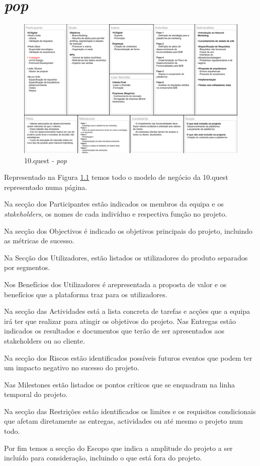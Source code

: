 \chapter{\textit{\gls{pop}}}
\label{a:bvm}

\begin{figure}[ht!]
	\begin{center}
		\includegraphics[width=1\textwidth]{img/bmc}
		\caption{10.quest - \textit{\gls{pop}}}
		\label{10q-bmc}
	\end{center}
\end{figure}

Representado na Figura \ref{10q-bmc} temos todo o modelo de negócio da 10.quest representado numa página.

Na secção dos Participantes estão indicados os membros da equipa e os \textit{stakeholders}, os nomes de cada indivíduo e respectiva função no projeto. 
 
Na secção dos Objectivos é indicado os objetivos principais do projeto, incluindo as métricas de sucesso. 
 
Na Secção dos Utilizadores, estão listados os utilizadores do produto separados por segmentos. 
 
Nos Benefícios dos Utilizadores é arepresentada a proposta de valor e os benefícios que a plataforma traz para os utilizadores. 
 
Na secção das Actividades está a lista concreta de tarefas e acções que a equipa irá ter que realizar para atingir os objetivos do projeto. Nas Entregas estão indicados os resultados e documentos que terão de ser apresentados aos stakeholders ou ao cliente. 
 
Na secção dos Riscos estão identificados possíveis futuros eventos que podem ter um impacto negativo no sucesso do projeto. 
 
Nas Milestones estão listados os pontos críticos que se enquadram na linha temporal do projeto. 

Na secção das Restrições estão identificados os limites e os requisitos condicionais que afetam diretamente as entregas, actividades ou até mesmo o projeto num todo. 

Por fim temos a secção do Escopo que indica a amplitude do projeto a ser incluído para consideração, incluindo o que está fora do projeto.